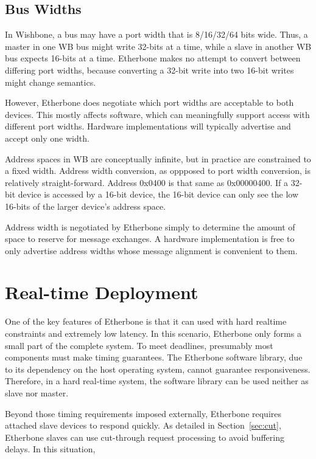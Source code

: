 \documentclass{article}
\begin{document}
\subsection{Bus Widths}

In Wishbone, 
a bus may have a port width that is 8/16/32/64 bits wide.
Thus, a master in one WB bus might write 32-bits at a time,
while a slave in another WB bus expects 16-bits at a time.
Etherbone makes no attempt to convert between differing port widths,
because converting a 32-bit write into two 16-bit writes might change semantics.

However, 
Etherbone does negotiate which port widths are acceptable to both devices.
This mostly affects software,
which can meaningfully support access with different port widths.
Hardware implementations will typically advertise and accept only one width.

Address spaces in WB are conceptually infinite, 
but in practice are constrained to a fixed width.
Address width conversion, as oppposed to port width conversion,
is relatively straight-forward.
Address 0x0400 is that same as 0x00000400.
If a 32-bit device is accessed by a 16-bit device,
the 16-bit device can only see the low 16-bits of the larger device's address space.

Address width is negotiated by Etherbone simply to determine the amount of
space to reserve for message exchanges.
A hardware implementation is free to only advertise address widths
whose message alignment is convenient to them.

\section{Real-time Deployment}
\label{sec:deployment}

One of the key features of Etherbone is that it can used with hard realtime constraints
and extremely low latency.
In this scenario, Etherbone only forms a small part of the complete system.
To meet deadlines, presumably most components must make timing guarantees.
The Etherbone software library, 
due to its dependency on the host operating system,
cannot guarantee responsiveness.
Therefore, in a hard real-time system,
the software library can be used neither as slave nor master.

Beyond those timing requirements imposed externally, 
Etherbone requires attached slave devices to respond quickly.
As detailed in Section~\ref{sec:cut},
Etherbone slaves can use cut-through request processing to avoid buffering delays.
In this situation, 
\end{document}
